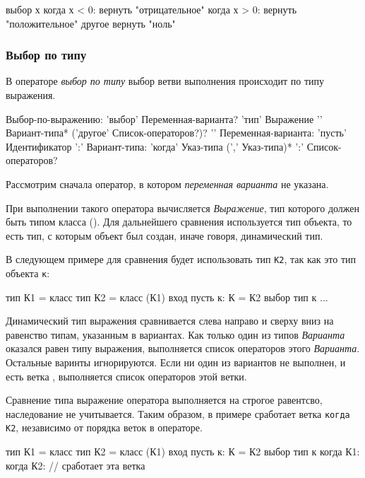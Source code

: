 \begin{Trivil}
выбор х {
когда х < 0: вернуть "отрицательное"
когда х > 0: вернуть "положительное"
другое вернуть "ноль"
}
\end{Trivil}

\hypertarget{switch-stmt-type}{%
\subsubsection{Выбор по типу}\label{stmt:switch-stmt-type}}

В операторе \emph{выбор по типу} выбор ветви выполнения происходит по типу выражения.

\begin{Grammar}
Выбор-по-выражению: 
    'выбор' Переменная-варианта? 'тип' Выражение '{'
    Вариант-типа*
    ('другое' Список-операторов?)?
    '}'
Переменная-варианта:    
    'пусть' Идентификатор ':'
Вариант-типа:
    'когда' Указ-типа (',' Указ-типа)* ':' 
    Список-операторов?
\end{Grammar}

Рассмотрим сначала оператор, в котором \emph{переменная варианта} не указана.

При выполнении такого оператора вычисляется \emph{Выражение}, тип которого должен быть типом класса ().
Для дальнейшего сравнения используется тип объекта, то есть тип, с которым объект был создан, иначе говоря, динамический тип.

В следующем примере для сравнения будет использовать тип \verb+К2+, так как это тип объекта \verb+к+:
\begin{Trivil}[vspace=2pt]
тип К1 = класс {}
тип К2 = класс (К1) {}
вход{
    пусть к: К = К2{}
    выбор тип к { ... }
}
\end{Trivil}

Динамический тип выражения сравнивается слева направо и сверху вниз на равенство типам, указанным в вариантах.
Как только один из типов \emph{Варианта} оказался равен типу выражения, выполняется список операторов этого \emph{Варианта}.
Остальные варинты игнорируются.
Если ни один из вариантов не выполнен, и есть ветка , выполняется список операторов этой ветки.

 Сравнение типа выражение оператора выполняется на строгое равентсво, наследование не учитывается. 
 Таким образом, в примере сработает ветка \verb+когда К2+, независимо от порядка веток в операторе.
\begin{Trivil}[vspace=2pt]
тип К1 = класс {}
тип К2 = класс (К1) {}
вход{
    пусть к: К = К2{}
    выбор тип к { 
    когда К1: 
    когда К2: // сработает эта ветка
    }
}
\end{Trivil}

